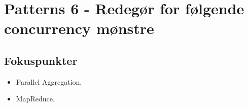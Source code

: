 \section{Patterns 6 - Redegør for følgende concurrency mønstre}

\subsection{Fokuspunkter}

\begin{itemize}
	\item Parallel Aggregation.
	\item MapReduce.
\end{itemize}